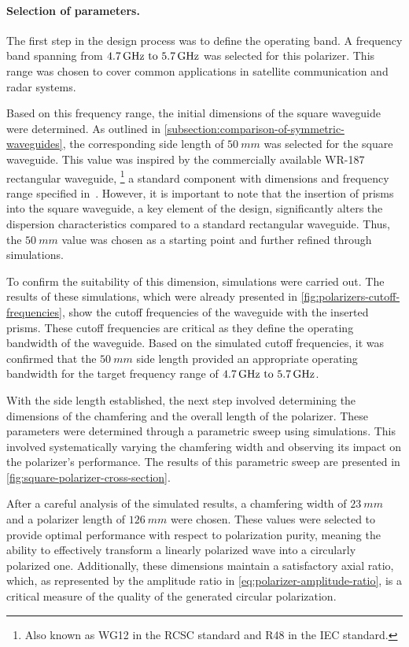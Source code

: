 \documentclass[11pt,a4paper,twoside,openany]{report}
\begin{document}
\paragraph{Selection of parameters.} The first step in the design process was to define the operating band. A frequency band spanning from $\frequencyrange$ was selected for this polarizer. This range was chosen to cover common applications in satellite communication and radar systems.

Based on this frequency range, the initial dimensions of the square waveguide were determined. As outlined in \cref{subsection:comparison-of-symmetric-waveguides}, the corresponding side length of $\qty{50}{mm}$ was selected for the square waveguide. This value was inspired by the commercially available WR-187 rectangular waveguide,
    \footnote{Also known as WG12 in the RCSC standard and R48 in the IEC standard.}
a standard component with dimensions and frequency range specified in~\parencite{spinner:waveguide-specifications}. However, it is important to note that the insertion of prisms into the square waveguide, a key element of the design, significantly alters the dispersion characteristics compared to a standard rectangular waveguide. Thus, the $\qty{50}{mm}$ value was chosen as a starting point and further refined through simulations.

To confirm the suitability of this dimension, simulations were carried out. The results of these simulations, which were already presented in \cref{fig:polarizers-cutoff-frequencies}, show the cutoff frequencies of the waveguide with the inserted prisms. These cutoff frequencies are critical as they define the operating bandwidth of the waveguide. Based on the simulated cutoff frequencies, it was confirmed that the $\qty{50}{mm}$ side length provided an appropriate operating bandwidth for the target frequency range of $\frequencyrange$.

With the side length established, the next step involved determining the dimensions of the chamfering and the overall length of the polarizer. These parameters were determined through a parametric sweep using simulations. This involved systematically varying the chamfering width and observing its impact on the polarizer's performance. The results of this parametric sweep are presented in \cref{fig:square-polarizer-cross-section}.

After a careful analysis of the simulated results, a chamfering width of $\qty{23}{mm}$ and a polarizer length of $\qty{126}{mm}$ were chosen. These values were selected to provide optimal performance with respect to polarization purity, meaning the ability to effectively transform a linearly polarized wave into a circularly polarized one. Additionally, these dimensions maintain a satisfactory axial ratio, which, as represented by the amplitude ratio in \cref{eq:polarizer-amplitude-ratio}, is a critical measure of the quality of the generated circular polarization.
\end{document}
